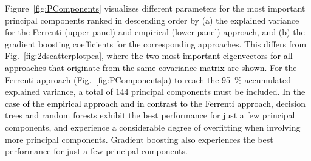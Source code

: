 \documentclass[superscriptaddress,unsortedaddress,
 amsmath,amssymb,
 aps,
]{revtex4-2}
\newcommand{\mrk}[1]{\textcolor{black}{#1}}
\begin{document}
Figure~\ref{fig:PComponents} visualizes different parameters for the most important principal components ranked in descending order by (a) the explained variance for the Ferrenti (upper panel) and empirical (lower panel) approach, and (b) the gradient boosting coefficients for the corresponding approaches. This differs from Fig.~\ref{fig:2dscatterplotpca}, where \mrk{the two most important eigenvectors for all approaches that originate from the same covariance matrix are shown}. 
For the Ferrenti approach (Fig.~\ref{fig:PComponents}a) to reach the \SI{95}{\percent} accumulated explained variance, a total of $144$ principal components must be included. \mrk{In the case of the empirical approach and in contrast to the Ferrenti approach}, decision trees and random forests exhibit the best performance for just a few principal components, and experience a considerable degree of overfitting when involving more principal components. Gradient boosting 
also experiences the best performance for just a few principal components. 
\end{document}
